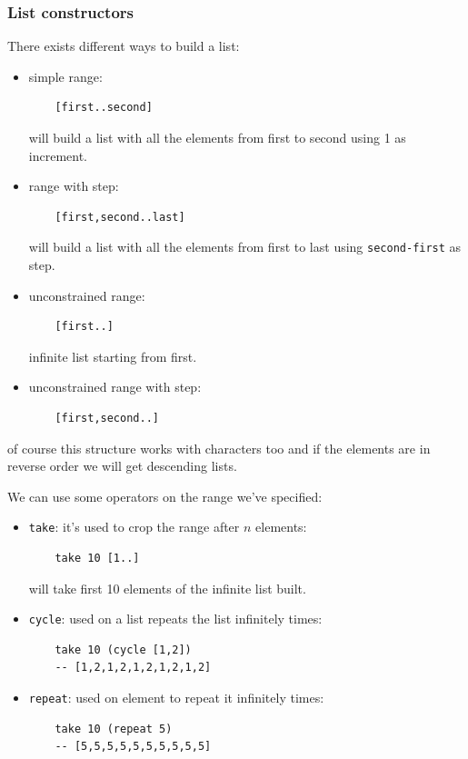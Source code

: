 \subsubsection{List constructors}
There exists different ways to build a list:
\begin{itemize}
    \item simple range:
\begin{verbatim}
    [first..second]
\end{verbatim}
    will build a list with all the elements from first to second using 1 as increment.

    \item range with step:
\begin{verbatim}
    [first,second..last]
\end{verbatim}
    will build a list with all the elements from first to last using \verb|second-first| as step.

    \item unconstrained range:
\begin{verbatim}
    [first..]
\end{verbatim}
    infinite list starting from first.

    \item unconstrained range with step:
\begin{verbatim}
    [first,second..]
\end{verbatim}
\end{itemize}
of course this structure works with characters too and if the elements are in reverse order we will get descending lists.

We can use some operators on the range we've specified:
\begin{itemize}
    \item \verb|take|: it's used to crop the range after $n$ elements:
\begin{verbatim}
    take 10 [1..]
\end{verbatim}
    will take first 10 elements of the infinite list built.

    \item \verb|cycle|: used on a list repeats the list infinitely times:
\begin{verbatim}
    take 10 (cycle [1,2])
    -- [1,2,1,2,1,2,1,2,1,2]
\end{verbatim}

    \item \verb|repeat|: used on element to repeat it infinitely times:
\begin{verbatim}
    take 10 (repeat 5)
    -- [5,5,5,5,5,5,5,5,5,5]
\end{verbatim}
\end{itemize}

